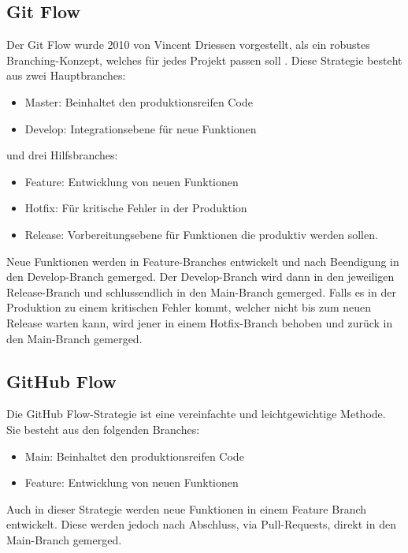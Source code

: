 \subsection{Git Flow}
\label{sec:GitFlow}
Der Git Flow wurde 2010 von Vincent Driessen vorgestellt, als ein robustes Branching-Konzept, welches für jedes Projekt passen soll \parencite{priyanka_gowdaashwath_narayana_gowda_git-branching-and-release-strategies_2022}.
Diese Strategie besteht aus zwei Hauptbranches:
\begin{itemize}
    \item Master: Beinhaltet den produktionsreifen Code  
    \item Develop: Integrationsebene für neue Funktionen
\end{itemize}
und drei Hilfsbranches:
\begin{itemize}
    \item Feature: Entwicklung von neuen Funktionen
    \item Hotfix: Für kritische Fehler in der Produktion
    \item Release: Vorbereitungsebene für Funktionen die produktiv werden sollen.
\end{itemize}
Neue Funktionen werden in Feature-Branches entwickelt und nach Beendigung in den Develop-Branch gemerged. Der Develop-Branch wird dann in den jeweiligen Release-Branch und schlussendlich in den Main-Branch gemerged. Falls es in der Produktion zu einem kritischen Fehler kommt, welcher nicht bis zum neuen Release warten kann, wird jener in einem Hotfix-Branch behoben und zurück in den Main-Branch gemerged.
\parencite{priyanka_gowdaashwath_narayana_gowda_git-branching-and-release-strategies_2022}

\subsection{GitHub Flow}
\label{sec:GitHubFlow}
Die GitHub Flow-Strategie ist eine vereinfachte und leichtgewichtige Methode. Sie besteht aus den folgenden Branches:
\begin{itemize}
    \item Main: Beinhaltet den produktionsreifen Code  
    \item Feature: Entwicklung von neuen Funktionen
\end{itemize}
Auch in dieser Strategie werden neue Funktionen in einem Feature Branch entwickelt. Diese werden jedoch nach Abschluss, via Pull-Requests, direkt in den Main-Branch gemerged.
\parencite{priyanka_gowdaashwath_narayana_gowda_git-branching-and-release-strategies_2022}

